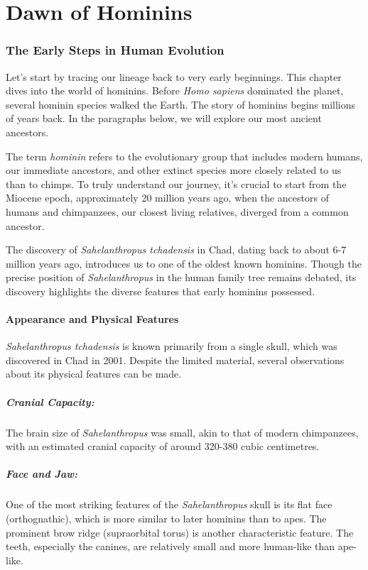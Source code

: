 \chapter{Dawn of Hominins}
\subsection*{The Early Steps in Human Evolution}
Let's start by tracing our lineage back to very early beginnings. This chapter dives into the world of hominins. Before \textit{Homo sapiens} dominated the planet, several hominin species walked the Earth. The story of hominins begins millions of years back. In the paragraphs below, we will explore our most ancient ancestors.

The term \textit{hominin} refers to the evolutionary group that includes modern humans, our immediate ancestors, and other extinct species more closely related to us than to chimps. To truly understand our journey, it's crucial to start from the Miocene epoch, approximately 20 million years ago, when the ancestors of humans and chimpanzees, our closest living relatives, diverged from a common ancestor.

The discovery of \textit{Sahelanthropus tchadensis} in Chad, dating back to about 6-7 million years ago, introduces us to one of the oldest known hominins. Though the precise position of \textit{Sahelanthropus} in the human family tree remains debated, its discovery highlights the diverse features that early hominins possessed.

\subsubsection*{Appearance and Physical Features}
\textit{Sahelanthropus tchadensis} is known primarily from a single skull, which was discovered in Chad in 2001. Despite the limited material, several observations about its physical features can be made.

\paragraph{Cranial Capacity:} The brain size of \textit{Sahelanthropus} was small, akin to that of modern chimpanzees, with an estimated cranial capacity of around 320-380 cubic centimetres.

\paragraph{Face and Jaw:} One of the most striking features of the \textit{Sahelanthropus} skull is its flat face (orthognathic), which is more similar to later hominins than to apes. The prominent brow ridge (supraorbital torus) is another characteristic feature. The teeth, especially the canines, are relatively small and more human-like than ape-like.

